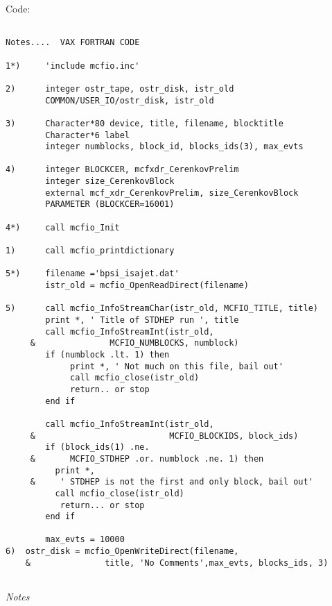 \vspace{.1in} 
 Code:
\begin{verbatim}

Notes....  VAX FORTRAN CODE

1*) 	'include mcfio.inc'

2)      integer ostr_tape, ostr_disk, istr_old
        COMMON/USER_IO/ostr_disk, istr_old 
	
3)      Character*80 device, title, filename, blocktitle
        Character*6 label  
        integer numblocks, block_id, blocks_ids(3), max_evts
	
4)      integer BLOCKCER, mcfxdr_CerenkovPrelim
        integer size_CerenkovBlock 
        external mcf_xdr_CerenkovPrelim, size_CerenkovBlock
        PARAMETER (BLOCKCER=16001) 	
	
4*)     call mcfio_Init

1)      call mcfio_printdictionary

5*)     filename ='bpsi_isajet.dat'
        istr_old = mcfio_OpenReadDirect(filename)
	
5)      call mcfio_InfoStreamChar(istr_old, MCFIO_TITLE, title)
        print *, ' Title of STDHEP run ', title
        call mcfio_InfoStreamInt(istr_old, 
     &               MCFIO_NUMBLOCKS, numblock)
        if (numblock .lt. 1) then 
             print *, ' Not much on this file, bail out'
             call mcfio_close(istr_old)
             return.. or stop 
        end if
	
        call mcfio_InfoStreamInt(istr_old,
     &                           MCFIO_BLOCKIDS, block_ids)
        if (block_ids(1) .ne.
     &       MCFIO_STDHEP .or. numblock .ne. 1) then  
          print *,
     &     ' STDHEP is not the first and only block, bail out'
          call mcfio_close(istr_old)
           return... or stop 
        end if
		
        max_evts = 10000 	 
6)	ostr_disk = mcfio_OpenWriteDirect(filename, 
    &               title, 'No Comments',max_evts, blocks_ids, 3) 
	 
\end{verbatim}

\vspace{.1in}

{\em Notes}

\vspace{.1in}

